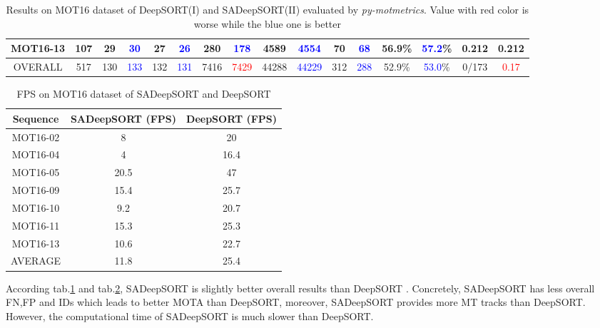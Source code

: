 \begin{landscape}
\begin{table}[H]
\begin{tabular}{||c|c|c|c|c|c|c|c|c|c|c|c|c|c|c|c||}
        MOT16-13 & 107 & 29  & \textcolor{blue}{30}  & 27  & \textcolor{blue}{26}  & 280  & \textcolor{blue}{178}  &  4589         & \textcolor{blue}{4554}  & 70  & \textcolor{blue}{68} & 56.9\% & \textcolor{blue}{57.2}\%  & 0.212 & 0.212          \\ \hline
        OVERALL  & 517 & 130 & \textcolor{blue}{133} & 132 & \textcolor{blue}{131} & 7416 & \textcolor{red}{7429}  &  44288        & \textcolor{blue}{44229} & 312 & \textcolor{blue}{288} & 52.9\% & \textcolor{blue}{53.0}\% & 0/173 & \textcolor{red}{0.17}          \\ \hline
    \end{tabular}
    \caption{Results on MOT16 dataset of DeepSORT(I) and SADeepSORT(II) evaluated by \textit{py-motmetrics}. Value with red color is worse while the blue one is better}
    \label{tab:sa_deepsort_result}
\end{table}
\end{landscape}

\pagebreak



\begin{table}[H]
    \begin{center}
     \begin{tabular}{||c | c | c ||} 
     \hline
    Sequence & SADeepSORT (\acrshort{FPS}) & DeepSORT\cite{Wojke2017simple} (\acrshort{FPS}) \\
    \hline
    \hline
    MOT16-02 & 8 & 20 \\
     \hline
    MOT16-04 & 4 & 16.4\\
    \hline
    MOT16-05 & 20.5 & 47 \\
    \hline
    MOT16-09 & 15.4 & 25.7 \\
    \hline
    MOT16-10 & 9.2 & 20.7\\
    \hline
    MOT16-11 &  15.3 &  25.3\\
    \hline
    MOT16-13 & 10.6 & 22.7\\
    \hline
    AVERAGE  & 11.8 & 25.4 \\
    
    \hline
    \end{tabular}
    \end{center}
        \caption{\acrshort{FPS} on MOT16 dataset\cite{Milan2016MOT16AB} of SADeepSORT and DeepSORT\cite{Wojke2017simple}}
        \label{tab:fps_com}
\end{table}

According tab.\ref{tab:sa_deepsort_result} and tab.\ref{tab:fps_com}, SADeepSORT is slightly better overall results than DeepSORT\cite{Wojke2017simple}
. Concretely, SADeepSORT has less overall \acrshort{FN},\acrshort{FP} and \acrshort{IDs} which leads to better \acrshort{MOTA} than DeepSORT\cite{Wojke2017simple}, moreover, 
SADeepSORT provides more \acrshort{MT} tracks than DeepSORT\cite{Wojke2017simple}. However, the computational time of SADeepSORT is much slower than DeepSORT\cite{Wojke2017simple}.



